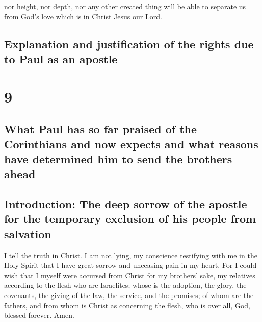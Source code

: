  nor height, nor depth, nor any other created thing will
be able to separate us from God's love which is in Christ Jesus our
Lord.

\hypertarget{explanation-and-justification-of-the-rights-due-to-paul-as-an-apostle}{%
\subsection{Explanation and justification of the rights due to Paul as
an
apostle}\label{explanation-and-justification-of-the-rights-due-to-paul-as-an-apostle}}

\hypertarget{section-8}{%
\section{9}\label{section-8}}

\hypertarget{what-paul-has-so-far-praised-of-the-corinthians-and-now-expects-and-what-reasons-have-determined-him-to-send-the-brothers-ahead}{%
\subsection{What Paul has so far praised of the Corinthians and now
expects and what reasons have determined him to send the brothers
ahead}\label{what-paul-has-so-far-praised-of-the-corinthians-and-now-expects-and-what-reasons-have-determined-him-to-send-the-brothers-ahead}}

\hypertarget{introduction-the-deep-sorrow-of-the-apostle-for-the-temporary-exclusion-of-his-people-from-salvation}{%
\subsection{Introduction: The deep sorrow of the apostle for the
temporary exclusion of his people from
salvation}\label{introduction-the-deep-sorrow-of-the-apostle-for-the-temporary-exclusion-of-his-people-from-salvation}}

 I tell the truth in Christ. I am not lying, my conscience
testifying with me in the Holy Spirit  that I have great
sorrow and unceasing pain in my heart.  For I could wish
that I myself were accursed from Christ for my brothers' sake, my
relatives according to the flesh  who are Israelites;
whose is the adoption, the glory, the covenants, the giving of the law,
the service, and the promises;  of whom are the fathers,
and from whom is Christ as concerning the flesh, who is over all, God,
blessed forever. Amen.

